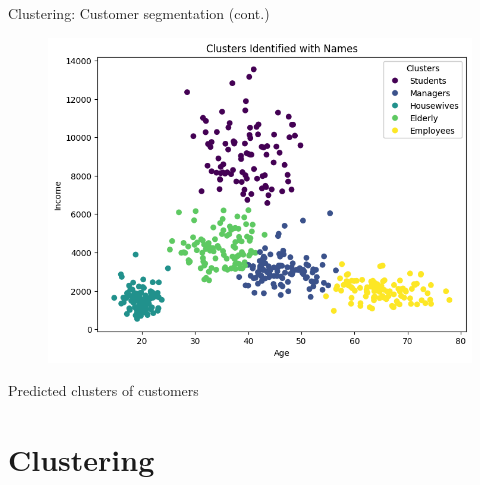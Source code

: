 \documentclass[serif, aspectratio=169]{beamer}
\begin{document}
\begin{frame}{Clustering: Customer segmentation (cont.)}
    \begin{figure}
        \centering
        \includegraphics[scale=0.45]{pic/customer_clusters.png}
    \end{figure}
    \begin{center}
        Predicted clusters of customers
    \end{center}
\end{frame}

\section{Clustering}
\end{document}
